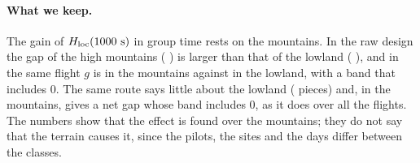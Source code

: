 \paragraph{What we keep.} The gain of $H_\mathrm{loc}(1000~\mathrm{s})$ in group time rests on the mountains. In the raw design the gap of the high mountains (\TnRawHighGS{} \TnRawHighGSBand) is larger than that of the lowland (\TnRawLowlandGS{} \TnRawLowlandGSBand), and in the same flight $g$ is \TnFlightMountainG{} in the mountains against \TnFlightLowlandG{} in the lowland, with a band that includes 0. The same route says little about the lowland (\TnRouteLowlandPiecesG{} pieces) and, in the mountains, gives a net gap whose band includes 0, as it does over all the flights. The numbers show that the effect is found over the mountains; they do not say that the terrain causes it, since the pilots, the sites and the days differ between the classes.
